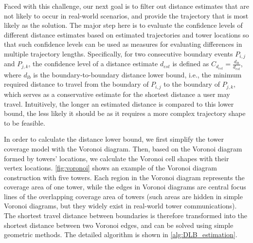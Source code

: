 Faced with this challenge, our next goal is to filter out distance estimates that are not likely to occur in real-world scenarios, and provide the trajectory that is most likely as the solution. The major step here is to evaluate the confidence levels of different distance estimates based on estimated trajectories and tower locations so that such confidence levels can be used as measures for evaluating differences in multiple trajectory lengths. Specifically, for two consecutive boundary events $P_{i,j}$ and $P_{j,k}$, the confidence level of a distance estimate $d_{est}$ is defined as $C_{d_{est}} = \frac{d_{lb}}{d_{est}}$, where $d_{lb}$ is the boundary-to-boundary distance lower bound, i.e., the minimum required distance to travel from the boundary of $P_{i,j}$ to the boundary of $P_{j,k}$, which serves as a conservative estimate for the shortest distance a user may travel. Intuitively, the longer an estimated distance is compared to this lower bound, the less likely it should be as it requires a more complex trajectory shape to be feasible.


In order to calculate the distance lower bound,
we first simplify the tower coverage model with the Voronoi diagram.
Then, based on the Voronoi diagram formed by towers' locations, we calculate the Voronoi cell shapes with their vertex locations.
\autoref{fig:voronoi} shows an example of the Voronoi diagram construction with five towers.
Each region in the Voronoi diagram represents the coverage area of one tower, while the edges in Voronoi diagrams are central focus lines of the overlapping coverage area of towers (such areas are hidden in simple Voronoi diagrams, but they widely exist in real-world tower communications).
The shortest travel distance between boundaries is therefore transformed into the shortest distance between two Voronoi edges,
and can be solved using simple geometric methods. The detailed algorithm is shown in \autoref{alg:DLB_estimation}.

